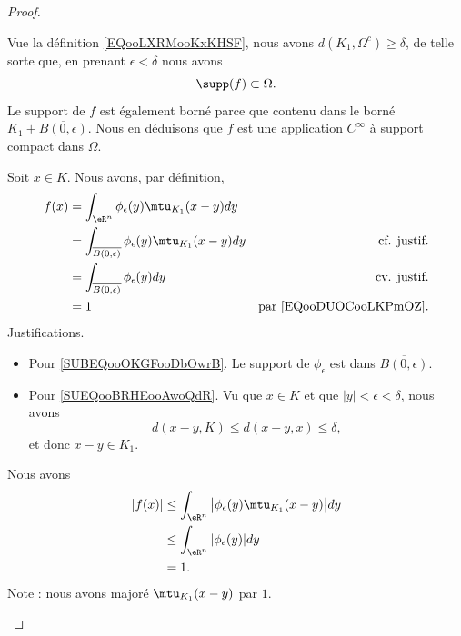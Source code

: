 \begin{proof}
\begin{subproof}
		Vue la définition \ref{EQooLXRMooKxKHSF}, nous avons \( d(K_1,\Omega^c)\geq \delta\), de telle sorte que, en prenant \( \epsilon<\delta\) nous avons
		\begin{equation}
			\supp(f)\subset \Omega.
		\end{equation}
		Le support de \( f\) est également borné parce que contenu dans le borné \( K_1+\overline{B(0,\epsilon)}\). Nous en déduisons que \( f\) est une application \( C^{\infty}\) à support compact dans \( \Omega\).

		\spitem[\( f(x)\) si \( x\in K\)]
		Soit \( x\in K\). Nous avons, par définition,
		\begin{subequations}
			\begin{align}
				f(x) & =\int_{\eR^n}\phi_{\epsilon}(y)\mtu_{K_1}(x-y)dy                                                                     \\
				     & =\int_{\overline{B(0,\epsilon)}}\phi_{\epsilon}(y)\mtu_{K_1}(x-y)dy & \text{cf. justif.} \label{SUBEQooOKGFooDbOwrB} \\
				     & =\int_{\overline{B(0,\epsilon)}}\phi_{\epsilon}(y)dy                & \text{cv. justif.}		\label{SUEQooBRHEooAwoQdR} \\
				     & = 1                                                                 & \text{par \eqref{EQooDUOCooLKPmOZ}}.
			\end{align}
		\end{subequations}
		Justifications.
		\begin{itemize}
			\item
			      Pour \ref{SUBEQooOKGFooDbOwrB}. Le support de \( \phi_{\epsilon}\) est dans \( \overline{B(0,\epsilon)}\).
			\item
			      Pour \ref{SUEQooBRHEooAwoQdR}. Vu que \( x\in K\) et que \( | y |<\epsilon<\delta\), nous avons
			      \begin{equation}
				      d(x-y,K)\leq d(x-y,x)\leq \delta,
			      \end{equation}
			      et donc \( x-y\in K_1\).
		\end{itemize}
		Nous avons
		\begin{subequations}
			\begin{align}
				| f(x) | & \leq \int_{\eR^n}\big| \phi_{\epsilon}(y)\mtu_{K_1}(x-y) \big|dy \\
				         & \leq \int_{\eR^n}| \phi_{\epsilon}(y) |dy                        \\
				         & =1.
			\end{align}
		\end{subequations}
		Note : nous avons majoré \( \mtu_{K_1}(x-y)\) par \( 1\).
	\end{subproof}
\end{proof}

